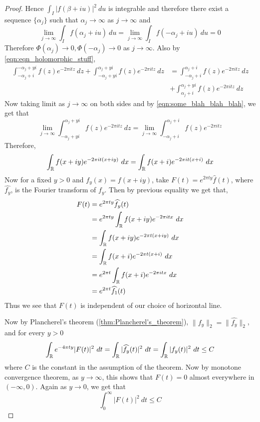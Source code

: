 \begin{proof}
  Hence $\int_I |f(\beta+iu)|^2 \ du$ is integrable and therefore there exist a sequence $\{\alpha_j\}$ such that $\alpha_j \to \infty$ as $j \to \infty$ and
  \begin{equation}
  \label{eqn:some_blah_blah_blah}
  \lim_{j \to \infty} \int_I f(\alpha_j + iu) \ du = \lim_{j \to \infty} \int_I f(-\alpha_j + iu) \ du = 0
  \end{equation}
  Therefore $\Phi(\alpha_j) \to 0, \Phi(-\alpha_j) \to 0$ as $j \to \infty$.
  Also by \autoref{eqn:eqn_holomorphic_stuff},
  \begin{equation*}
    \begin{split}
      \int_{-\alpha_j+i}^{-\alpha_j +yi} f(z)e^{-2\pi it z} \ dz + \int_{-\alpha_j+yi}^{\alpha_j +yi} f(z)e^{-2\pi it z} \ dz &= \int_{-\alpha_j+i}^{\alpha_j +i} f(z)e^{-2\pi it z} \ dz \\
      &+ \int_{\alpha_j+i}^{\alpha_j +yi} f(z)e^{-2\pi it z} \ dz
    \end{split}
  \end{equation*}
  Now taking limit as $j \to \infty$ on both sides and by \autoref{eqn:some_blah_blah_blah}, we get that $$\lim_{j\to \infty} \int_{-\alpha_j+yi}^{\alpha_j +yi} f(z)e^{-2\pi it z} \ dz = \lim_{j \to \infty} \int_{-\alpha_j +i}^{\alpha_j +i} f(z)e^{-2\pi it z}$$
  Therefore,
  $$\int_\mathbb R f(x+iy)e^{-2\pi i t(x+iy)} \ dx = \int_\mathbb R f(x+i)e^{-2\pi it(x+i)} \ dx$$
  Now for a fixed $y>0$ and $f_y(x) = f(x+iy)$, take $F(t) = e^{2\pi ty}\widehat{f}(t)$, where $\widehat{f_y}$, is the Fourier transform of $f_y$. Then by previous equality we get that, 
  \begin{align*}
    F(t) &= e^{2\pi ty} \widehat{f_y}(t)\\
          &= e^{2\pi ty}\int_\mathbb R f(x+iy) e^{-2\pi itx} \ dx \\
          &= \int_\mathbb R f(x+iy)e^{-2\pi t(x+iy)} \ dx \\
          &= \int_\mathbb R f(x+i)e^{-2\pi t(x+i)} \ dx \\
          &= e^{2\pi t}\int_\mathbb R f(x+i) e^{-2\pi itx} \ dx \\
          &= e^{2\pi t} \widehat{f_1}(t) \\
  \end{align*}
  Thus we see that $F(t)$ is independent of our choice of horizontal line.
 
  Now by Plancherel's theorem (\autoref{thm:Plancherel's_theorem}), $\|f_y\|_2 = \|\widehat{f_y}\|_2$, and for every $y>0$
  $$\int_\mathbb R e^{-4 \pi t y} |F(t)|^2 \ dt = \int_\mathbb R |\widehat{f_y}(t)|^2 \ dt = \int_\mathbb R |f_y(t)|^2 \ dt \le C$$
  where $C$ is the constant in the assumption of the theorem.
  Now by monotone convergence theorem, as $y\to \infty$, this shows that $F(t) =0$ almost everywhere in $(-\infty, 0)$. Again as $y \to 0$, we get that $$\int_0^\infty |F(t)|^2 \ dt \le C$$


\end{proof}
